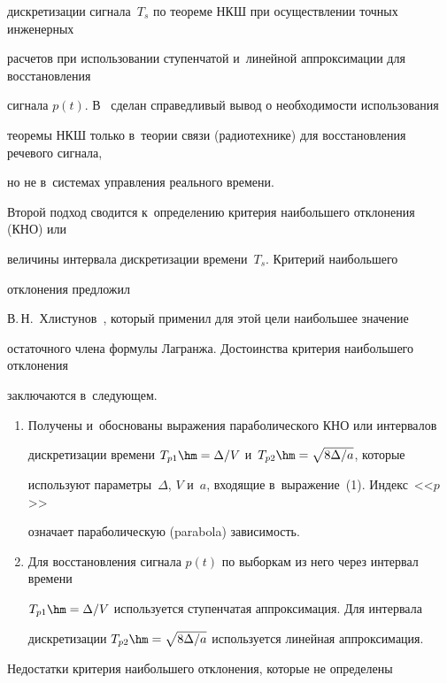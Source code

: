 дискретизации сигнала~$T_s$ по теореме НКШ при осуществлении точных инженерных 


расчетов при использовании ступенчатой и~линейной аппроксимации для восстановления 


сигнала $p(t)$. В~\cite{11-m} сделан справедливый вывод о необходимости использования 


теоремы НКШ только в~теории связи (радиотехнике) для восстановления речевого сигнала, 


но не в~системах управления реального времени. 


  


  Второй подход сводится к~определению критерия наибольшего отклонения (КНО) или 


величины интервала дискретизации времени~$T_s$. Критерий наибольшего


отклонения предложил 


В.\,Н.~Хлистунов~\cite{12-m, 13-m}, который применил для этой цели наибольшее значение 


остаточного члена формулы Лагранжа. Достоинства критерия наибольшего отклонения 


заключаются в~следующем.


  \begin{enumerate}[1.]


  \item 


   Получены и~обоснованы выражения параболического КНО или интервалов 


дискретизации времени $T_{p1}\hm=\Delta / V$ и~$T_{p2}\hm=\sqrt{8\Delta/a}$, которые 


используют параметры~$\Delta$, $V$ и~$a$, входящие в~выражение~(1). Индекс~<<$p$>> 


означает параболическую (parabola) зависимость.


  \item 


  Для восстановления сигнала $p(t)$ по выборкам из него через интервал времени 


$T_{p1}\hm=\Delta /V$ используется ступенчатая аппроксимация. Для интервала 


дискретизации $T_{p2}\hm= \sqrt{8\Delta/a}$  используется линейная аппроксимация.


  \end{enumerate}


  


  Недостатки критерия наибольшего отклонения, которые не определены 


